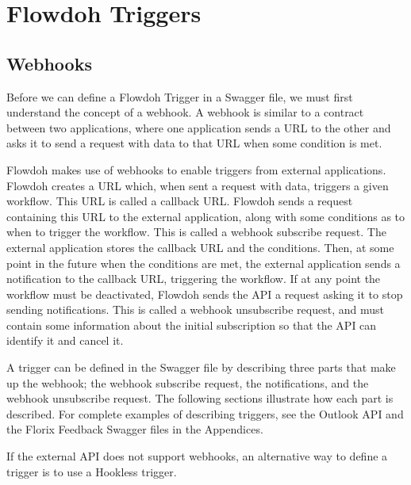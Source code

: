 \section{Flowdoh Triggers}
\label{sec:triggers}
\subsection{Webhooks}
Before we can define a Flowdoh Trigger in a Swagger file, we must first understand the concept of a webhook. A webhook is similar to a contract between two applications, where one application sends a URL to the other and asks it to send a request with data to that URL when some condition is met. 

Flowdoh makes use of webhooks to enable triggers from external applications. Flowdoh creates a URL which, when sent a request with data, triggers a given workflow. This URL is called a callback URL. Flowdoh sends a request containing this URL to the external application, along with some conditions as to when to trigger the workflow. This is called a webhook subscribe request. The external application stores the callback URL and the conditions. Then, at some point in the future when the conditions are met, the external application sends a notification to the callback URL, triggering the workflow. If at any point the workflow must be deactivated, Flowdoh sends the API a request asking it to stop sending notifications. This is called a webhook unsubscribe request, and must contain some information about the initial subscription so that the API can identify it and cancel it.

A trigger can be defined in the Swagger file by describing three parts that make up the webhook; the webhook subscribe request, the notifications, and the webhook unsubscribe request. The following sections illustrate how each part is described. For complete examples of describing triggers, see the Outlook API and the Florix Feedback Swagger files in the Appendices.

If the external API does not support webhooks, an alternative way to define a trigger is to use a Hookless trigger.

